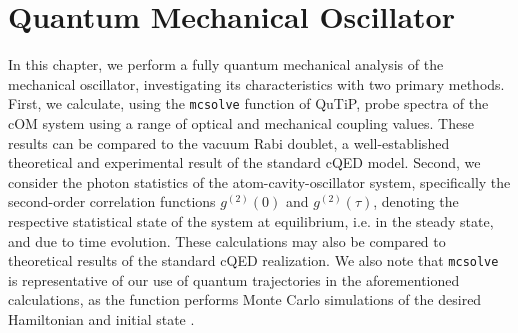 \chapter{Quantum Mechanical Oscillator}
In this chapter, we perform a fully quantum mechanical analysis of the mechanical oscillator, investigating its characteristics with two primary methods. First, we calculate, using the \texttt{mcsolve} function of QuTiP, probe spectra of the cOM system using a range of optical and mechanical coupling values. These results can be compared to the vacuum Rabi doublet, a well-established theoretical \cite{mondragon1983, agarwal1984} and experimental \cite{thompson1992} result of the standard cQED model. Second, we consider the photon statistics of the atom-cavity-oscillator system, specifically the second-order correlation functions $g^{(2)}(0)$ and $g^{(2)}(\tau)$, denoting the respective statistical state of the system at equilibrium, i.e. in the steady state, and due to time evolution. These calculations may also be compared to theoretical results \cite{brecha1999} of the standard cQED realization. We also note that \texttt{mcsolve} is representative of our use of quantum trajectories in the aforementioned calculations, as the function performs Monte Carlo simulations of the desired Hamiltonian and initial state \cite{qutipref}.

